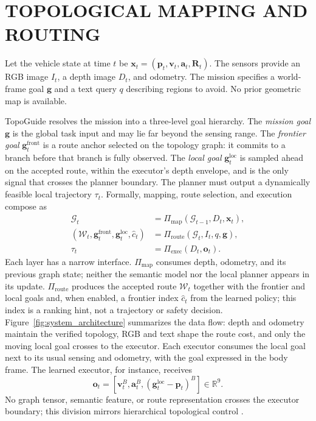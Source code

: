 \documentclass[letterpaper,10pt,conference]{ieeeconf}
\newcommand{\vect}[1]{\boldsymbol{#1}}
\newcommand{\R}{\mathbb{R}}
\begin{document}
\section{TOPOLOGICAL MAPPING AND ROUTING}
\label{sec:method}
Let the vehicle state at time $t$ be
$\vect{x}_t=(\vect{p}_t,\vect{v}_t,\vect{a}_t,\vect{R}_t)$.
The sensors provide an RGB image $I_t$, a depth image $D_t$, and odometry.
The mission specifies a world-frame goal $\vect{g}$ and a text query $q$
describing regions to avoid.  No prior geometric map is available.

TopoGuide resolves the mission into a three-level goal hierarchy.  The
\emph{mission goal} $\vect{g}$ is the global task input and may lie far
beyond the sensing range.  The \emph{frontier goal}
$\vect{g}^{\mathrm{front}}_t$ is a route anchor selected on the topology
graph: it commits to a branch before that branch is fully observed.  The
\emph{local goal} $\vect{g}^{\mathrm{loc}}_t$ is sampled ahead on the
accepted route, within the executor's depth envelope, and is the only
signal that crosses the planner boundary.  The planner must output a
dynamically feasible local trajectory $\tau_t$.  Formally, mapping, route
selection, and execution compose as
\begin{align}
  \mathcal{G}_t
    &= \Pi_{\mathrm{map}}(\mathcal{G}_{t-1},D_t,\vect{x}_t), \\
  (\mathcal{W}_t,\vect{g}^{\mathrm{front}}_t,
   \vect{g}^{\mathrm{loc}}_t,\hat c_t)
    &= \Pi_{\mathrm{route}}(\mathcal{G}_t,I_t,q,\vect{g}), \\
  \tau_t
    &= \Pi_{\mathrm{exec}}(D_t,\vect{o}_t).
\end{align}
Each layer has a narrow interface.  $\Pi_{\mathrm{map}}$
consumes depth, odometry, and its previous graph state; neither the semantic
model nor the local planner appears in its update.  $\Pi_{\mathrm{route}}$
produces the accepted route $\mathcal{W}_t$ together with the frontier and
local goals and, when enabled, a frontier index $\hat c_t$ from the learned
policy; this index is a ranking hint, not a trajectory or safety decision.
Figure~\ref{fig:system_architecture} summarizes the data flow: depth and
odometry maintain the verified topology, RGB and text shape the route
cost, and only the moving local goal crosses to the executor.
Each executor consumes the local goal next to its usual sensing and
odometry, with the goal expressed in the body frame.  The learned
executor, for instance, receives
\begin{equation}
 \vect{o}_t = [\vect{v}^{B}_t,\vect{a}^{B}_t,
                (\vect{g}^{\mathrm{loc}}_t-\vect{p}_t)^{B}] \in \R^9.
\end{equation}
No graph tensor, semantic feature, or route representation crosses the
executor
boundary; this division mirrors hierarchical topological control
\cite{ving}.
\end{document}
